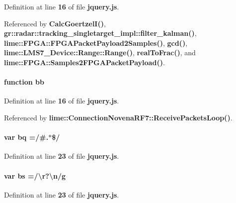 Definition at line {\bf 16} of file {\bf jquery.\+js}.



Referenced by {\bf Calc\+Goertzel\+I()}, {\bf gr\+::radar\+::tracking\+\_\+singletarget\+\_\+impl\+::filter\+\_\+kalman()}, {\bf lime\+::\+F\+P\+G\+A\+::\+F\+P\+G\+A\+Packet\+Payload2\+Samples()}, {\bf gcd()}, {\bf lime\+::\+L\+M\+S7\+\_\+\+Device\+::\+Range\+::\+Range()}, {\bf real\+To\+Frac()}, and {\bf lime\+::\+F\+P\+G\+A\+::\+Samples2\+F\+P\+G\+A\+Packet\+Payload()}.

\paragraph[{bb}]{\setlength{\rightskip}{0pt plus 5cm}function bb}\label{soapysdr_2build_2docs_2html_2jquery_8js_a1d6558865876e1c8cca029fce41a4bdb}


Definition at line {\bf 16} of file {\bf jquery.\+js}.



Referenced by {\bf lime\+::\+Connection\+Novena\+R\+F7\+::\+Receive\+Packets\+Loop()}.

\paragraph[{bq}]{\setlength{\rightskip}{0pt plus 5cm}var bq =/\#.$\ast$\$/}\label{soapysdr_2build_2docs_2html_2jquery_8js_af6ee77c71b2c89bdb365145ac5ad1219}


Definition at line {\bf 23} of file {\bf jquery.\+js}.

\paragraph[{bs}]{\setlength{\rightskip}{0pt plus 5cm}var bs =/\textbackslash{}r?\textbackslash{}n/g}\label{soapysdr_2build_2docs_2html_2jquery_8js_ae77642f8ef73fb9c20c2a737d956acda}


Definition at line {\bf 23} of file {\bf jquery.\+js}.

